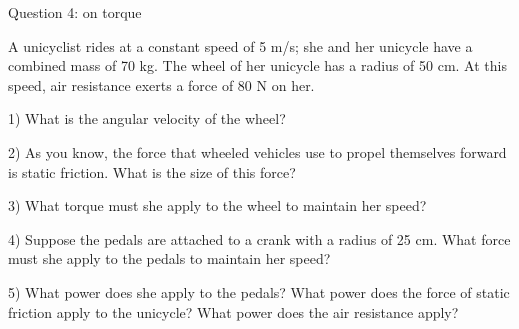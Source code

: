 \documentclass[12pt]{article}
\begin{document}
\centerline{\large Question 4: on torque}

 A unicyclist rides at a constant speed of 5 m/s; she and her unicycle have a combined mass of 70 kg. The wheel of her unicycle has a radius of 50 cm. At this speed, air resistance exerts a force of 80 N on her.

       1) What is the angular velocity of the wheel?
\vspace{1.2in}

       2) As you know, the force that wheeled vehicles use to propel themselves forward is static friction. What is the size of this force?
\vspace {1.2in}

       3) What torque must she apply to the wheel to maintain her speed?
\vspace{2in}

\newpage

       4) Suppose the pedals are attached to a crank with a radius of 25 cm. What force must she apply to the pedals to maintain her speed?
\vspace{3in}

       5) What power does she apply to the pedals? What power does the force of static friction apply to the unicycle? What power does the air resistance apply?

 
\end{document}
